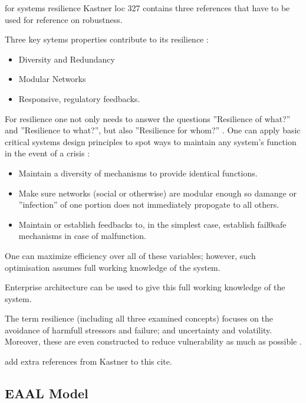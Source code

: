 \begin{remark}
	for systems resilience Kastner loc 327 contains three references that have to be used for reference on robustness.
\end{remark}
Three key sytems properties contribute to its resilience \parencite[p. 9]{MartinBreen2011}:
\begin{itemize}
	\item{Diversity and Redundancy}
	\item{Modular Networks}
	\item{Responsive, regulatory feedbacks.}
\end{itemize}
For resilience one not only needs to answer the questions ''Resilience of what?'' and ''Resilience to what?'', but also ''Resilience for whom?'' \parencite[p. 21]{Lebel2006}. One can apply basic critical systems design principles to spot ways to maintain any system's function in the event of a crisis \parencite[p. 10]{MartinBreen2011}:
\begin{itemize}
	\item{Maintain a diversity of mechanisms to provide identical functions.}
	\item{Make sure networks (social or otherwise) are modular enough so damange or ''infection'' of one portion does not immediately propogate to all others.}
	\item{Maintain or establish feedbacks to, in the simplest case, establish fail0safe mechanisms in case of malfunction.}
\end{itemize}
One can maximize efficiency over all of these variables; however, such optimisation assumes full working knowledge of the system.
\begin{remark}
	Enterprise architecture can be used to give this full working knowledge of the system.
\end{remark}

The term resilience (including all three examined concepts) focuses on the avoidance of harmfull stressors and failure; and uncertainty and volatility. Moreover, these are even constructed to reduce vulnerability as much as possible \parencite{MartinBreen2011}.
\begin{remark}
	add extra references from Kastner to this cite.
\end{remark}

\subsection{EAAL Model}
\label{sub:eaal}

